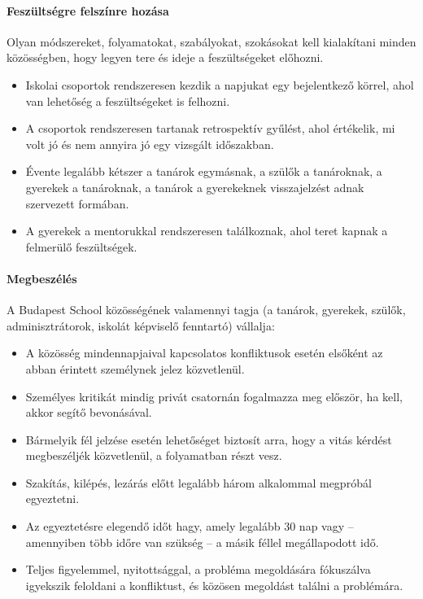\paragraph{Feszültségre felszínre hozása}
Olyan módszereket, folyamatokat, szabályokat, szokásokat kell kialakítani
minden közösségben, hogy legyen tere és ideje a feszültségeket előhozni.
\begin{itemize}
      \item Iskolai csoportok rendszeresen kezdik a napjukat egy bejelentkező
            körrel, ahol van lehetőség a feszültségeket is felhozni.
      \item A csoportok rendszeresen tartanak retrospektív gyűlést, ahol
            értékelik, mi volt jó és nem annyira jó egy vizsgált időszakban.
      \item Évente legalább kétszer a tanárok egymásnak, a szülők a tanároknak, a
            gyerekek a tanároknak, a tanárok a gyerekeknek visszajelzést adnak
            szervezett
            formában.
      \item A gyerekek a mentorukkal rendszeresen találkoznak, ahol teret kapnak
            a felmerülő feszültségek.
\end{itemize}

\paragraph{Megbeszélés}

A Budapest School közösségének valamennyi tagja (a tanárok, gyerekek,
szülők, adminisztrátorok, iskolát képviselő fenntartó) vállalja:

\begin{itemize}

      \item A közösség mindennapjaival kapcsolatos konfliktusok esetén elsőként
            az
            abban érintett személynek jelez közvetlenül.
      \item Személyes kritikát mindig privát csatornán fogalmazza meg először, ha
            kell, akkor segítő bevonásával.
      \item   Bármelyik fél jelzése esetén lehetőséget biztosít
            arra, hogy a vitás kérdést megbeszéljék közvetlenül, a folyamatban
            részt vesz.
      \item
            Szakítás, kilépés, lezárás előtt legalább három alkalommal megpróbál
            egyeztetni.
      \item
            Az egyeztetésre elegendő időt hagy, amely legalább 30 nap vagy --
            amennyiben több időre van szükség -- a másik féllel megállapodott
            idő.
      \item
            Teljes figyelemmel, nyitottsággal, a probléma megoldására fókuszálva
            igyekszik feloldani a konfliktust, és közösen megoldást találni a
            problémára.
\end{itemize}

